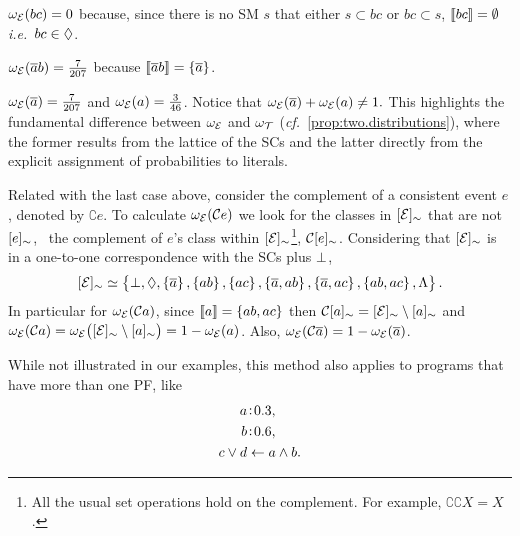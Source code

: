 \documentclass[x11names]{tlp}
\begin{document}
\begin{example}
\begin{description}
		\item $\wgtE\at{bc} = 0$ because, since there is no \ac{SM} $s$ that either $s \subset bc$ or $bc \subset s$, $\left\llbracket bc \right\rrbracket = \emptyset$ \emph{i.e.}\ $bc \in \Diamond$.

		\item $\wgtE\at{\co{a}b} = \frac{7}{207}$ because $\left\llbracket \overline{a}b \right\rrbracket = \set{\ensuremath{\overline{a}}}$.

		\item $\wgtE\at{\co{a}} = \frac{7}{207}$ and  $\wgtE\at{a} = \frac{3}{46}$.
Notice that
		      $ \wgtE\at{\co{a}} + \wgtE\at{a} \not= 1. $
		      This highlights the fundamental difference between $\wgtE$ and $\wgtT$ (\emph{cf.~}\cref{prop:two.distributions}), where the former results from the lattice of the \aclp{SC} and the latter directly from the explicit assignment of probabilities to literals.
	\end{description}

	Related with the last case above, consider the complement of a consistent
	event $e$, denoted by $\complement e$.
To calculate $\wgtE\at{\complement e}$
	we look for the classes in $\class{\EVENTSset}$ that are not $[{e}]_{\sim}$, \ie~the complement of $e$'s class within
	$\class{\EVENTSset}$\footnote{All the usual set operations hold on the
		complement.
For example, $\complement\complement X = X$.},
	$\mathcal{C}[{e}]_{\sim}$.
Considering that $\class{\EVENTSset}$ is in a
	one-to-one correspondence with the \aclp{SC} plus $\bot$, 
	\begin{equation*}
		\class{\EVENTSset} \simeq \set{
			\inconsistent, \indepclass, \set{\co{a}}
			, \set{ab}, \set{ac}, \set{\co{a}, ab}
			, \set{\co{a}, ac}, \set{ab, ac}, \consequenceclass}.
	\end{equation*}
	In particular for $\wgtE\at{\complement a}$, since $\left\llbracket a \right\rrbracket = \set{ab, ac}$ then $\complement \class{a} = \class{\EVENTSset} \setminus \class{a}$ and
	\(
	\wgtE\at{\complement a} =  \wgtE\at{\class{\EVENTSset} \setminus \class{a}} = 1 - \wgtE\at{a}
	\).
	Also, $\wgtE\at{\complement \co{a}} =  1 - \wgtE\at{\co{a}} $.
\end{example}

While not illustrated in our examples, this method also applies to programs that have more than one \acl{PF}, like
\begin{equation*}
	\begin{aligned}
		\weightfact{a & }{0.3},             %
		\\
		\weightfact{b & }{0.6},             %
		\\
		c \vee d    & \clause a \wedge b.
	\end{aligned}
\end{equation*}
\end{document}
